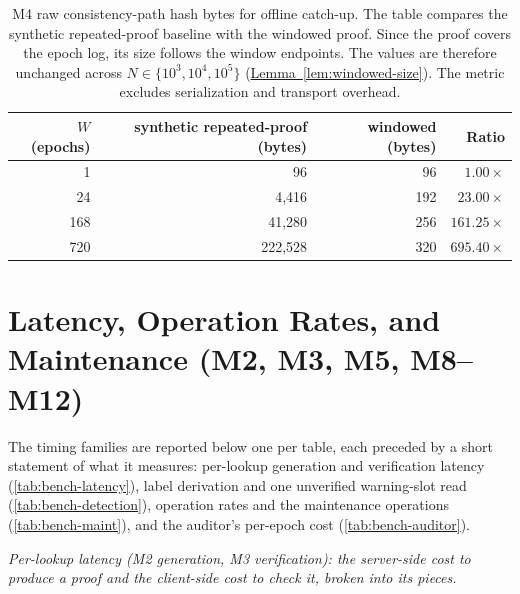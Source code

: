 \begin{table}[ht]
\centering
\caption[M4: catch-up consistency-path hash bytes.]{M4 raw consistency-path hash bytes for offline
catch-up. The table compares the synthetic repeated-proof baseline with the
windowed proof. Since the proof covers the epoch log, its size follows the window endpoints.
The values are therefore unchanged across $N\in\{10^3,10^4,10^5\}$
(\hyperref[lem:windowed-size]{Lemma~\ref*{lem:windowed-size}}). The metric excludes serialization and transport overhead.}
\label{tab:bench-m4}
\small
\begin{tabular}{@{}rrrr@{}}
\toprule
$W$ (epochs) & synthetic repeated-proof (bytes) & windowed (bytes) & Ratio \\
\midrule
1   & 96      & 96  & $1.00\times$ \\
24  & 4{,}416   & 192 & $23.00\times$ \\
168 & 41{,}280  & 256 & $161.25\times$ \\
720 & 222{,}528 & 320 & $695.40\times$ \\
\bottomrule
\end{tabular}
\end{table}

\section{Latency, Operation Rates, and Maintenance (M2, M3, M5, M8--M12)}\label{sec:bench-timings}

The timing families are reported below one per table, each preceded by a short statement of what it
measures: per-lookup generation and verification latency (\cref{tab:bench-latency}), label
derivation and one unverified warning-slot read (\cref{tab:bench-detection}), operation rates and
the maintenance operations
(\cref{tab:bench-maint}), and the auditor's per-epoch cost (\cref{tab:bench-auditor}).

\medskip\noindent\emph{Per-lookup latency (M2 generation, M3 verification): the server-side cost to
produce a proof and the client-side cost to check it, broken into its pieces.}

